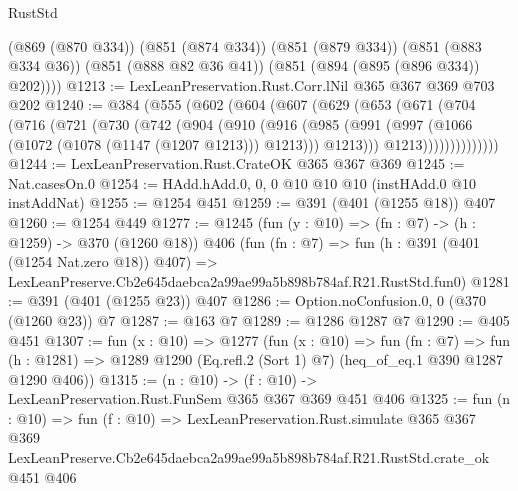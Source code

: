 \begin{lexlean}{RustStd}
\begin{coremodule}
        (@869 (@870 @334))
        (@851 (@874 @334))
        (@851 (@879 @334))
        (@851 (@883 @334 @36))
        (@851 (@888 @82 @36 @41))
        (@851 (@894 (@895 (@896 @334)) @202))))
@1213 := LexLeanPreservation.Rust.Corr.lNil @365 @367 @369 @703 @202
@1240 := @384
    (@555
      (@602
        (@604
          (@607
            (@629
              (@653
                (@671
                  (@704
                    (@716
                      (@721
                        (@730
                          (@742
                            (@904
                              (@910
                                (@916
                                  (@985
                                    (@991
                                      (@997 (@1066 (@1072 (@1078 (@1147 (@1207 @1213))) @1213)))
                                      @1213)))
                                @1213))))))))))))))
@1244 := LexLeanPreservation.Rust.CrateOK @365 @367 @369
@1245 := Nat.casesOn.{0}
@1254 := HAdd.hAdd.{0, 0, 0} @10 @10 @10 (instHAdd.{0} @10 instAddNat)
@1255 := @1254 @451
@1259 := @391 (@401 (@1255 @18)) @407
@1260 := @1254 @449
@1277 := @1245
    (fun (y : @10) => (fn : @7) -> (h : @1259) -> @370 (@1260 @18))
    @406
    (fun (fn : @7) =>
    fun (h : @391 (@401 (@1254 Nat.zero @18)) @407) =>
    LexLeanPreserve.Cb2e645daebca2a99ae99a5b898b784af.R21.RustStd.fun0)
@1281 := @391 (@401 (@1255 @23)) @407
@1286 := Option.noConfusion.{0, 0} (@370 (@1260 @23)) @7
@1287 := @163 @7
@1289 := @1286 @1287 @7
@1290 := @405 @451
@1307 := fun (x : @10) =>
  @1277
    (fun (x : @10) =>
    fun (fn : @7) =>
    fun (h : @1281) => @1289 @1290 (Eq.refl.{2} (Sort 1) @7) (heq_of_eq.{1} @390 @1287 @1290 @406))
@1315 := (n : @10) -> (f : @10) -> LexLeanPreservation.Rust.FunSem @365 @367 @369 @451 @406
@1325 := fun (n : @10) =>
  fun (f : @10) =>
  LexLeanPreservation.Rust.simulate
    @365
    @367
    @369
    LexLeanPreserve.Cb2e645daebca2a99ae99a5b898b784af.R21.RustStd.crate_ok
    @451
    @406
\end{coremodule}
\end{lexlean}
